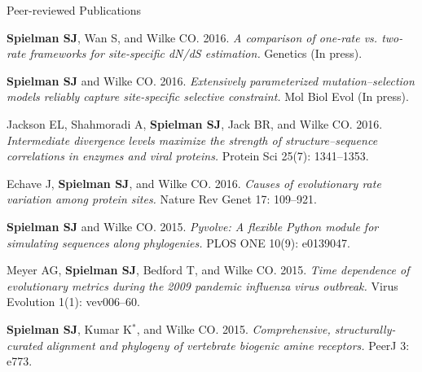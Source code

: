 \documentclass{resume} %
\begin{document}
\vspace*{0.35cm}
\begin{rSection}{Peer-reviewed Publications}
\vspace*{0.25cm}

\begin{etaremune}[leftmargin=1.5em]
\item \textbf{Spielman SJ}, Wan S, and Wilke CO. 2016. \emph{A comparison of one-rate vs. two-rate frameworks for site-specific dN/dS estimation.} Genetics (In press).\\


\item \textbf{Spielman SJ} and Wilke CO. 2016. \emph{Extensively parameterized mutation--selection models reliably capture site-specific selective constraint.} Mol Biol Evol (In press).\\


\item Jackson EL, Shahmoradi A, \textbf{Spielman SJ}, Jack BR, and Wilke CO. 2016. \emph{Intermediate divergence levels maximize the strength of structure--sequence correlations in enzymes and viral proteins.} Protein Sci 25(7): 1341--1353.\\


\item Echave J, \textbf{Spielman SJ}, and Wilke CO. 2016. \emph{Causes of evolutionary rate variation among protein sites.} Nature Rev Genet 17: 109--921.\\


\item \textbf{Spielman SJ} and Wilke CO. 2015. \emph{Pyvolve: A flexible Python module for simulating sequences along phylogenies.} PLOS ONE 10(9): e0139047.\\


\item Meyer AG, \textbf{Spielman SJ}, Bedford T, and Wilke CO. 2015. \emph{Time dependence of evolutionary metrics during the 2009 pandemic influenza virus outbreak.} Virus Evolution 1(1): vev006--60. \\


\item \textbf{Spielman SJ}, Kumar K$^\ast$, and Wilke CO. 2015. \emph{Comprehensive, structurally-curated alignment and phylogeny of vertebrate biogenic amine receptors.} PeerJ 3: e773. \\



\end{etaremune}
\end{rSection}
\end{document}
